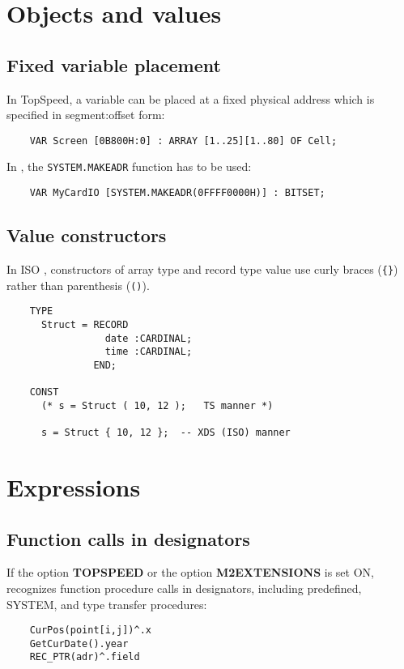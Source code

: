 \section{Objects and values}

\subsection{Fixed variable placement}

    In TopSpeed, a variable can be placed at a fixed physical address 
    which is specified in segment:offset form:

\verb'    VAR Screen [0B800H:0] : ARRAY [1..25][1..80] OF Cell;'

    In \XDS{}, the \verb'SYSTEM.MAKEADR' function has to be used:

\verb'    VAR MyCardIO [SYSTEM.MAKEADR(0FFFF0000H)] : BITSET;'

\subsection{Value constructors}

    In ISO \mt{}, constructors of array type and record type value use curly
    braces (\verb'{}') rather than parenthesis (\verb'()').

\begin{verbatim}
    TYPE
      Struct = RECORD
                 date :CARDINAL;
                 time :CARDINAL;
               END;

    CONST
      (* s = Struct ( 10, 12 );   TS manner *)

      s = Struct { 10, 12 };  -- XDS (ISO) manner
\end{verbatim}

\section{Expressions}

\subsection{Function calls in designators}

    If the option {\bf TOPSPEED} or the option {\bf M2EXTENSIONS} is set ON,
    \xds{} recognizes function procedure calls in designators, including
    predefined, SYSTEM, and type transfer procedures:

\begin{verbatim}
    CurPos(point[i,j])^.x
    GetCurDate().year
    REC_PTR(adr)^.field
\end{verbatim}

